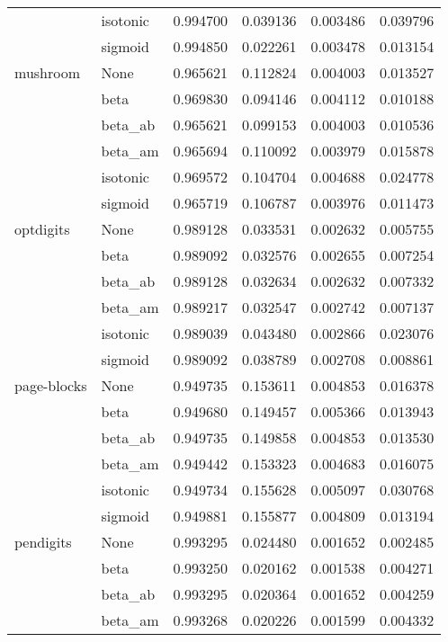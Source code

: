 \begin{tabular}{llrrrr}
        & isotonic &  0.994700 &  0.039136 &  0.003486 &  0.039796 \\
        & sigmoid &  0.994850 &  0.022261 &  0.003478 &  0.013154 \\
mushroom & None &  0.965621 &  0.112824 &  0.004003 &  0.013527 \\
        & beta &  0.969830 &  0.094146 &  0.004112 &  0.010188 \\
        & beta\_ab &  0.965621 &  0.099153 &  0.004003 &  0.010536 \\
        & beta\_am &  0.965694 &  0.110092 &  0.003979 &  0.015878 \\
        & isotonic &  0.969572 &  0.104704 &  0.004688 &  0.024778 \\
        & sigmoid &  0.965719 &  0.106787 &  0.003976 &  0.011473 \\
optdigits & None &  0.989128 &  0.033531 &  0.002632 &  0.005755 \\
        & beta &  0.989092 &  0.032576 &  0.002655 &  0.007254 \\
        & beta\_ab &  0.989128 &  0.032634 &  0.002632 &  0.007332 \\
        & beta\_am &  0.989217 &  0.032547 &  0.002742 &  0.007137 \\
        & isotonic &  0.989039 &  0.043480 &  0.002866 &  0.023076 \\
        & sigmoid &  0.989092 &  0.038789 &  0.002708 &  0.008861 \\
page-blocks & None &  0.949735 &  0.153611 &  0.004853 &  0.016378 \\
        & beta &  0.949680 &  0.149457 &  0.005366 &  0.013943 \\
        & beta\_ab &  0.949735 &  0.149858 &  0.004853 &  0.013530 \\
        & beta\_am &  0.949442 &  0.153323 &  0.004683 &  0.016075 \\
        & isotonic &  0.949734 &  0.155628 &  0.005097 &  0.030768 \\
        & sigmoid &  0.949881 &  0.155877 &  0.004809 &  0.013194 \\
pendigits & None &  0.993295 &  0.024480 &  0.001652 &  0.002485 \\
        & beta &  0.993250 &  0.020162 &  0.001538 &  0.004271 \\
        & beta\_ab &  0.993295 &  0.020364 &  0.001652 &  0.004259 \\
        & beta\_am &  0.993268 &  0.020226 &  0.001599 &  0.004332 \\

\end{tabular}
